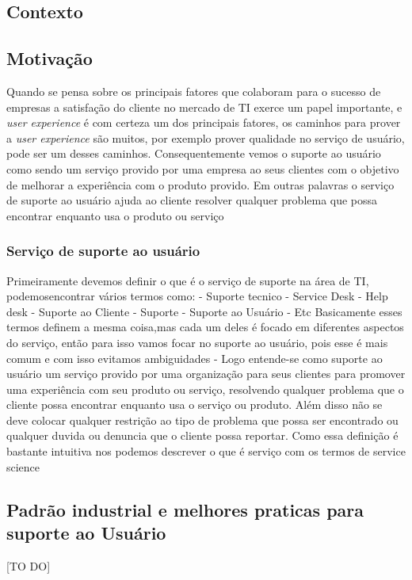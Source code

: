 \documentclass[11pt,a4paper]{article}
\begin{document}
\begin{flushleft}
\section{Contexto}

\subsection{Motivação}
Quando se pensa sobre os principais fatores que colaboram para o sucesso de
empresas a  satisfação do cliente no mercado de TI exerce um papel importante,
e \textit{user experience} é com certeza um dos principais fatores, os caminhos
para prover a \textit{user experience} são muitos, por exemplo prover qualidade
no serviço de usuário, pode ser um desses caminhos. Consequentemente vemos o
suporte ao usuário como sendo um serviço provido por uma empresa  ao seus
clientes com o objetivo de melhorar a experiência com o produto provido. Em
outras palavras o serviço de suporte ao usuário ajuda ao cliente resolver
qualquer problema que possa encontrar enquanto usa o produto ou serviço

\end{flushleft}

\subsubsection{Serviço de suporte ao usuário}
Primeiramente devemos definir o que é o serviço de suporte na área de TI,
podemosencontrar vários termos como:
 		- Suporte tecnico
		- Service Desk
		- Help desk
		- Suporte ao Cliente
		- Suporte
		- Suporte ao Usuário
		- Etc
Basicamente esses termos definem a mesma coisa,mas cada um deles é focado
em diferentes aspectos do serviço, então para isso vamos focar no suporte
ao usuário, pois esse é mais comum e com isso evitamos ambiguidades
- Logo entende-se como suporte ao usuário um serviço provido por uma organização
para seus clientes para promover uma experiência com seu produto ou serviço,
resolvendo qualquer problema que o cliente possa encontrar enquanto usa o
serviço ou produto. Além disso não se  deve colocar qualquer restrição ao tipo
de problema que possa ser encontrado ou qualquer duvida ou denuncia que o
cliente possa reportar.
Como essa definição é bastante intuitiva nos podemos descrever o que
é serviço com os termos de service science


\subsection{Padrão industrial  e melhores praticas para suporte ao Usuário}
[TO DO]
\end{document}
